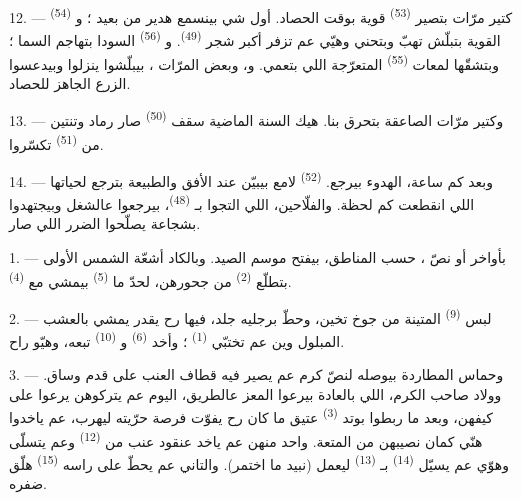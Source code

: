 12. --- كتير مرّات بتصير  \textsuperscript{(53)} قوية بوقت
الحصاد. أول شي بينسمع هدير  من بعيد ؛ و
\textsuperscript{(54)} القوية بتبلّش تهبّ وبتحني وهيّي عم تزفر أكبر شجر
 \textsuperscript{(49)}. و \textsuperscript{(56)}
السودا بتهاجم السما ؛ وبتشقّها لمعات  \textsuperscript{(55)}
المتعرّجة اللي بتعمي. و، وبعض المرّات ،
بيبلّشوا ينزلوا وبيدعسوا الزرع الجاهز للحصاد.

13. --- وكتير مرّات الصاعقة بتحرق بنا. هيك السنة الماضية سقف
 \textsuperscript{(50)} صار رماد وتنتين من
 \textsuperscript{(51)} تكسّروا.

14. --- وبعد كم ساعة، الهدوء بيرجع. 
\textsuperscript{(52)} لامع بيبيّن عند الأفق والطبيعة بترجع لحياتها اللي
انقطعت كم لحظة. والفلّاحين، اللي التجوا بـ
\textsuperscript{(48)}، بيرجعوا عالشغل وبيجتهدوا بشجاعة يصلّحوا الضرر
اللي صار.

\VUsaut{6.0mm}
\VUsaut{3.6mm}

\VUsaut{1.4mm}
\VUsaut{4.0mm}

1. --- بأواخر  أو نصّ ، حسب المناطق، بيفتح
موسم الصيد. وبالكاد أشعّة الشمس الأولى بتطلّع 
\textsuperscript{(2)} من جحورهن، لحدّ ما 
\textsuperscript{(5)} بيمشي مع  \textsuperscript{(4)}.

2. --- لبس  \textsuperscript{(9)} المتينة من جوخ تخين،
وحطّ برجليه  جلد، فيها رح يقدر يمشي بالعشب المبلول وين
عم تختبّي  \textsuperscript{(1)} ؛ وأخد 
\textsuperscript{(6)} و \textsuperscript{(10)} تبعه،
وهيّو راح.

3. --- وحماس المطاردة بيوصله لنصّ كرم عم يصير فيه قطاف العنب على
قدم وساق. وولاد صاحب الكرم، اللي بالعادة بيرعوا المعز عالطريق، اليوم
عم يتركوهن يرعوا على كيفهن، وبعد ما ربطوا بوتد 
\textsuperscript{(3)} عتيق ما كان رح يفوّت فرصة حرّيته ليهرب، عم ياخدوا
هنّي كمان نصيبهن من المتعة. واحد منهن عم ياخد عنقود عنب من  \textsuperscript{(12)} وعم يتسلّى وهوّي عم يسيّل 
\textsuperscript{(14)} بـ \textsuperscript{(13)} ليعمل
 (نبيد ما اختمر). والتاني عم يحطّ على راسه  \textsuperscript{(15)} هلّق ضفره.

